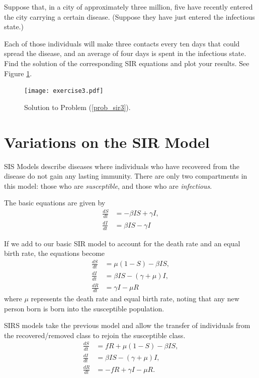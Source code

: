 \begin{problem}
Suppose that, in a city of approximately three million, five have recently entered the city carrying a certain disease.
(Suppose they have just entered the infectious state.)

Each of those individuals will make three contacts every ten days that could spread the disease, and an average of four days is spent in the infectious state.
Find the solution of the corresponding SIR equations and plot your results. See Figure \ref{sir:exercise3}.
\label{prob_sir3}
\end{problem}


\begin{figure}[ht]
\centering
\texttt{[image: exercise3.pdf]}
\caption{Solution to Problem (\ref{prob_sir3}).}
\label{sir:exercise3}
\end{figure}



\section*{Variations on the SIR Model}

SIS Models describe diseases where individuals who have recovered from the disease do not gain
any lasting immunity.
There are only two compartments in this model: those who are \emph{susceptible}, and those who are \emph{infectious}.

The basic equations are given by
\begin{align*}
\frac{dS}{dt} &=-\beta I S + \gamma I ,\\
\frac{dI}{dt} &= \beta I S-\gamma I
\end{align*}

If we add to our basic SIR model to account for the death rate and an equal birth rate, the equations become
\begin{align*}
\frac{dS}{dt} &=\mu(1 -S) - \beta I S,\\
\frac{dI}{dt} &= \beta I S - (\gamma + \mu)I, \\
\frac{dR}{dt} &= \gamma I - \mu R
\end{align*}
where $\mu$ represents the death rate and equal birth rate, noting that any new person born is born into the susceptible population.

SIRS models take the previous model and allow the transfer of individuals from the recovered/removed class to rejoin the susceptible class.
\begin{align*}
\frac{dS}{dt} &= fR + \mu(1 -S) - \beta I S,\\
\frac{dI}{dt} &= \beta I S - (\gamma + \mu)I, \\
\frac{dR}{dt} &= -fR + \gamma I - \mu R.
\end{align*}

